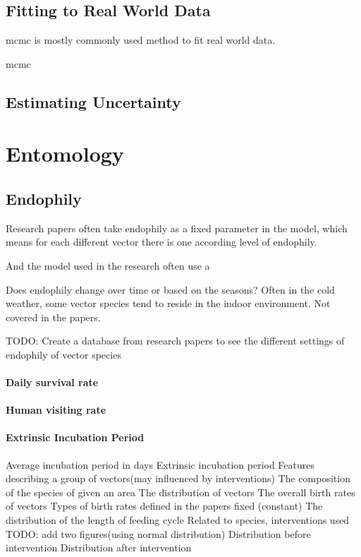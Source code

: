 \documentclass[a4paper, 12pt, twoside]{article}
\begin{document}
\subsection{Fitting to Real World Data}
\gls{mcmc} is mostly commonly used method to fit real world data.

\gls{mcmc}

\subsection{Estimating Uncertainty}

\section{Entomology}
\subsection{Endophily}
Research papers often take endophily as a fixed parameter in the model, which means for each different vector there is one according level of endophily.

And the model used in the research often use a 

Does endophily change over time or based on the seasons? Often in the cold weather, some vector species tend to reside in the indoor environment. Not covered in the papers.

TODO:
Create a database from research papers to see the different settings of endophily of vector species

\paragraph{Daily survival rate}

\paragraph{Human visiting rate}

\paragraph{Extrinsic Incubation Period}
Average incubation period in days
Extrinsic incubation period
Features describing a group of vectors(may influenced by interventions)
The composition of the species of given an area
The distribution of vectors
The overall birth rates of vectors
	Types of birth rates defined in the papers
fixed (constant)
The distribution of the length of feeding cycle
Related to species, interventions used
TODO: add two figures(using normal distribution)
Distribution before intervention
Distribution after intervention
\end{document}
